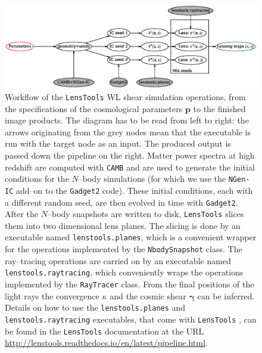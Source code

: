 \documentclass[5p]{elsarticle}
\newcommand{\bb}[1]{\mathbf{#1}}
\newcommand{\ttt}[1]{\texttt{#1}}
\newcommand{\LT}{\texttt{LensTools} }
\begin{document}
\begin{figure}
\includegraphics[scale=0.65]{Figures/flow.eps}
\caption{Workflow of the \LT WL shear simulation operations, from the specifications of the cosmological parameters $\bb{p}$ to the finished image products. The diagram has to be read from left to right: the arrows originating from the grey nodes mean that the executable is run with the target node as an input. The produced output is passed down the pipeline on the right. Matter power spectra at high redshift are computed with \ttt{CAMB} and are used to generate the initial conditions for the $N$--body simulations (for which we use the \ttt{NGen-IC} add--on to the \ttt{Gadget2} code). These initial conditions, each with a different random seed, are then evolved in time with \ttt{Gadget2}. After the $N$--body snapshots are written to disk, \LT slices them into two dimensional lens planes. The slicing is done by an executable named \ttt{lenstools.planes}, which is a convenient wrapper for the operations implemented by the \ttt{NbodySnapshot} class. The ray--tracing operations are carried on by an executable named \ttt{lenstools.raytracing}, which conveniently wraps the operations implemented by the \ttt{RayTracer} class. From the final positions of the light rays the convergence $\kappa$ and the cosmic shear $\pmb{\gamma}$ can be inferred. Details on how to use the \ttt{lenstools.planes} and \ttt{lenstools.raytracing} executables, that come with \LT, can be found in the \LT documentation at the URL \url{http://lenstools.readthedocs.io/en/latest/pipeline.html}.}
\label{pipescheme}
\end{figure}
\end{document}
